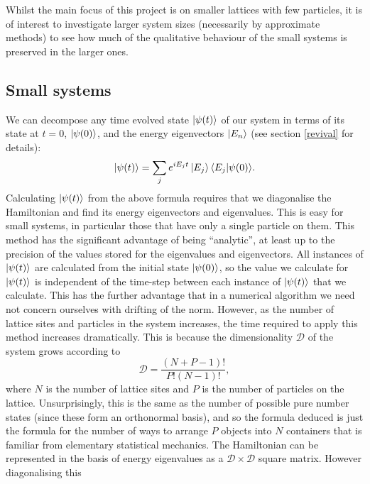 \documentclass[a4paper, 10pt]{article}
\theoremstyle{plain}
\begin{document}
Whilst the main focus of this project is on smaller lattices with few particles,
it is of interest to investigate larger system sizes (necessarily by approximate
methods) to see how much of the qualitative behaviour of the small systems is
preserved in the larger ones.

\subsection{Small systems}

We can decompose any time evolved state $\ket{\psi(t)}$ of our system in terms
of its state at $t=0$, $\ket{\psi(0)}$, and the energy eigenvectors $\ket{E_n}$
(see section \ref{revival} for details):
\begin{equation}
    \label{eq:SmallSystems_PsiTimeEvolution}
    \ket{\psi(t)} = \sum_{j}{e^{i E_{j}t} \ket{E_{j}} \braket{E_{j}|\psi(0)}}.
\end{equation}
Calculating $\ket{\psi(t)}$ from the above formula requires that we diagonalise
the Hamiltonian and find its energy eigenvectors and eigenvalues. This is easy
for small systems, in particular those that have only a single particle on them.
This method has the significant advantage of being ``analytic'', at least up to
the precision of the values stored for the eigenvalues and eigenvectors. All
instances of $\ket{\psi(t)}$ are calculated from the initial state
$\ket{\psi(0)}$, so the value we calculate for $\ket{\psi(t)}$ is independent of
the time-step between each instance of $\ket{\psi(t)}$ that we calculate. This
has the further advantage that in a numerical algorithm we need not concern
ourselves with drifting of the norm. However, as the number of lattice sites and
particles in the system increases, the time required to apply this method
increases dramatically. This is because the dimensionality $\mathcal{D}$ of the
system grows according to
\begin{equation}
    \label{dimensionality_exact}
    \mathcal{D} = \frac{(N + P - 1)!}{P! (N-1)!},
\end{equation}
where $N$ is the number of lattice sites and $P$ is the number of particles on
the lattice. Unsurprisingly, this is the same as the number of possible pure
number states (since these form an orthonormal basis), and so the formula
deduced is just the formula for the number of ways to arrange $P$ objects into
$N$ containers that is familiar from elementary statistical mechanics.
The Hamiltonian can be represented in the basis of energy eigenvalues as a
$\mathcal{D} \times \mathcal{D}$ square matrix. However diagonalising this
\end{document}
